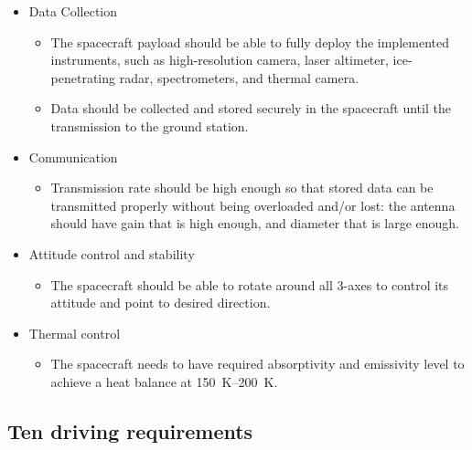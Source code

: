 \begin{itemize}
\item{Data Collection}
  \begin{itemize}
  \item The spacecraft payload should be able to fully deploy the
    implemented instruments, such as high-resolution camera, laser
    altimeter, ice-penetrating radar, spectrometers, and thermal
    camera.
  \item Data should be collected and stored securely in the spacecraft
    until the transmission to the ground station.
  \end{itemize}

\item{Communication}
  \begin{itemize}
  \item Transmission rate should be high enough so that stored data
    can be transmitted properly without being overloaded and/or lost:
    the antenna should have gain that is high enough, and diameter
    that is large enough.
  \end{itemize}

\item{Attitude control and stability}
  \begin{itemize}
  \item The spacecraft should be able to rotate around all 3-axes to
    control its attitude and point to desired direction.
  \end{itemize}

\item{Thermal control}
  \begin{itemize}
  \item The spacecraft needs to have required absorptivity and
    emissivity level to achieve a heat balance at
    \SI{150}{K}--\SI{200}{K}.
  \end{itemize}

\end{itemize}

\subsection{Ten driving requirements}

